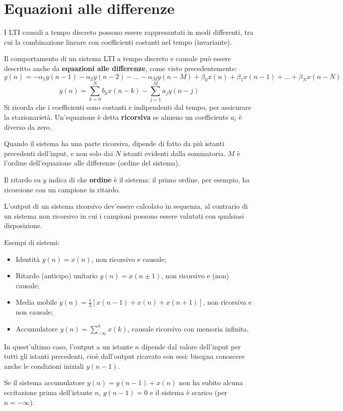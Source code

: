 \section{Equazioni alle differenze}
I LTI causali a tempo discreto possono essere rappresantati in modi differenti, tra cui la combinazione lineare con coefficienti costanti nel tempo (invariante). 

Il comportamento di un sistema LTI a tempo discreto e causale può essere descritto anche da \textbf{equazioni alle differenze}, come visto precedentemente:
$$y(n) = -\alpha_1y(n-1) - \alpha_2y(n - 2) - \ldots - \alpha_My(n - M) + \beta_0x(n) + \beta_1x(n - 1) + \ldots + \beta_Nx(n - N)$$
$$y(n) = \sum_{k=0}^{N} b_kx(n - k) - \sum_{j=1}^{M} a_jy(n - j)$$
Si ricorda che i coefficienti sono costanti e indipendenti dal tempo, per assicurare la stazionarietà. Un'equazione è detta \textbf{ricorsiva} se almeno un coefficiente $a_i$ è diverso da zero.

Quando il sistema ha una parte ricorsiva, dipende di fatto da più istanti precedenti dell'input, e non solo dai $N$ istanti evidenti dalla sommatoria. $M$ è l'ordine dell'equazione alle differenze (ordine del sistema).

Il ritardo su $y$ indica di che \textbf{ordine} è il sistema: il primo ordine, per esempio, ha ricorsione con un campione in ritardo. 

L'output di un sistema ricorsivo dev'essere calcolato in sequenza, al contrario di un sistema non ricorsivo in cui i campioni possono essere valutati con qualsiasi disposizione.

Esempi di sistemi:
\begin{itemize}
	\item Identità $y(n) = x(n)$, non ricorsivo e causale;
	\item Ritardo (anticipo) unitario $y(n) = x(n \pm 1)$, non ricorsivo e (non) causale;
	\item Media mobile $y(n) = \frac{1}{3} [x(n - 1) + x(n) + x(n + 1)]$, non ricorsiva e non causale;
	\item Accumulatore $y(n) = \sum_{-\infty}^{n} x(k)$, causale ricorsivo con memoria infinita.
\end{itemize}
In quest'ultimo caso, l'output a un istante $n$ dipende dal valore dell'input per tutti gli istanti precedenti, cioè dall'output ricavato con essi: bisogna conoscere anche le condizioni iniziali $y(n - 1)$.

Se il sistema accumulatore $y(n) = y(n - 1) + x(n)$ non ha subito alcuna eccitazione prima dell'istante $n$, $y(n - 1) = 0$ e il sistema è scarico (per $n = -\infty$).


